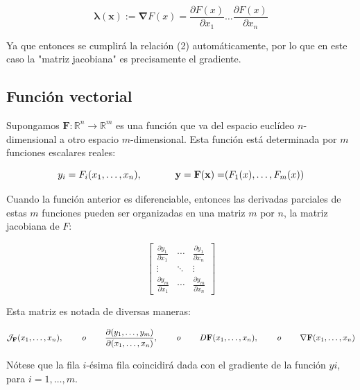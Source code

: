\begin{equation*}
\mathbf{\lambda(x)} := \mathbf{\nabla}F(x) = \frac{\partial F(x)}{\partial x_1} \ldots \frac{\partial F(x)}{\partial x_n}
\end{equation*}

Ya que entonces se cumplirá la relación (2) automáticamente, por lo que en este caso la "matriz jacobiana" es precisamente el gradiente.

\subsection{Función vectorial}

Supongamos $\mathbf{F} \colon \mathbb{R}^n \rightarrow \mathbb{R}^m$ es una función que va del espacio euclídeo $n$-dimensional a otro espacio $m$-dimensional. Esta función está determinada por $m$ funciones escalares reales:

\begin{equation*}
y_i = F_i(x_1, \ldots, x_n), \hspace{1.2cm} \mathbf{y=F(x)=}(F_1(x),\ldots,F_m(x))
\end{equation*}

Cuando la función anterior es diferenciable, entonces las derivadas parciales de estas $m$ funciones pueden ser organizadas en una matriz $m$ por $n$, la matriz jacobiana de $F$:

$$
\begin{bmatrix}
\frac{\partial y_1}{\partial x_1} & \cdots & \frac{\partial y_1}{\partial x_n} \\
\vdots & \ddots & \vdots \\
\frac{\partial y_m}{\partial x_1} & \cdots & \frac{\partial y_m}{\partial x_n}
\end{bmatrix}
$$

Esta matriz es notada de diversas maneras:

$$
\mathcal{J}_\textbf{F}(x_1, \ldots, x_n),\hspace{0.8cm} o \hspace{0.8cm} \frac{\partial(y_1,\ldots, y_m)}{\partial(x_1,\ldots, x_n)},\hspace{0.8cm} o \hspace{0.8cm} D\textbf{F}(x_1, \ldots, x_n),\hspace{0.8cm} o \hspace{0.8cm} \mathbf{\nabla F}(x_1, \ldots, x_n) 
$$

Nótese que la fila $i$-ésima fila coincidirá dada con el gradiente de la función $yi$, para $i=1,\ldots,m$.

